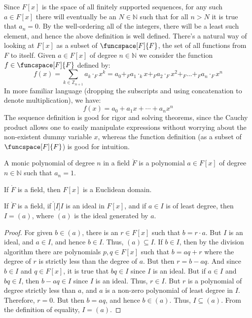 \documentclass{article}                                                        %
\begin{document}
        Since $F[x]$ is the space of all finitely supported sequences, for any
        such $a\in{F}[x]$ there will eventually be an $N\in\mathbb{N}$ such that
        for all $n>N$ it is true that $a_{n}=0$. By the well-ordering all of the
        integers, there will be a least such element, and hence the above
        definition is well defined. There's a natural way of looking at
        $F[x]$ as a subset of $\funcspace[F]{F}$, the set of all functions from
        $F$ to itself. Given $a\in{F}[x]$ of degree $n\in\mathbb{N}$ we consider
        the function $f\in\funcspace[F]{F}$ defined by:
        \begin{equation}
            f(x)=\sum_{k\in\mathbb{Z}_{n+1}}a_{k}\cdot_{F}x^{k}
            =a_{0}+_{F}a_{1}\cdot_{k}x+_{F}a_{2}\cdot_{F}x^{2}+_{F}\dots
            +_{F}a_{n}\cdot_{F}x^{n}
        \end{equation}
        In more familiar language (dropping the subscripts and using
        concatenation to denote multiplication), we have:
        \begin{equation}
            f(x)=a_{0}+a_{1}x+\cdots+a_{n}x^{n}
        \end{equation}
        The sequence definition is good for rigor and solving theorems, since
        the Cauchy product allows one to easily manipulate expressions without
        worrying about the non-existent dummy variable $x$, whereas the function
        definition (as a subset of $\funcspace[F]{F}$) is good for intuition.
        \begin{definition}
            A monic polynomial of degree $n$ in a field $\ring{F}$ is a
            polynomial $a\in{F}[x]$ of degree $n\in\mathbb{N}$ such that
            $a_{n}=1$.
        \end{definition} 
        \begin{theorem}
            If $\ring{F}$ is a field, then $F[x]$ is a Euclidean domain.
        \end{theorem}
        \begin{theorem}
            If $\ring{F}$ is a field, if $\ring[I]{I}$ is an ideal in $F[x]$,
            and if $a\in{I}$ is of least degree, then $I=(a)$, where $(a)$ is
            the ideal generated by $a$.
        \end{theorem}
        \begin{proof}
            For given $b\in(a)$, there is an $r\in{F}[x]$ such that
            $b=r\cdot{a}$. But $I$ is an ideal, and $a\in{I}$, and hence
            $b\in{I}$. Thus, $(a)\subseteq{I}$. If $b\in{I}$, then by the
            division algorithm there are polynomials $p,q\in{F}[x]$ such that
            $b=aq+r$ where the degree of $r$ is strictly less than the degree of
            $a$. But then $r=b-aq$. And since $b\in{I}$ and $q\in{F}[x]$, it is
            true that $bq\in{I}$ since $I$ is an ideal. But if $a\in{I}$ and
            $bq\in{I}$, then $b-aq\in{I}$ since $I$ is an ideal. Thus,
            $r\in{I}$. But $r$ is a polynomial of degree strictly less than
            $a$, and $a$ is a non-zero polynomial of least degree in $I$.
            Therefore, $r=0$. But then $b=aq$, and hence $b\in(a)$. Thus,
            $I\subseteq(a)$. From the definition of equality, $I=(a)$.
        \end{proof}
\end{document}

